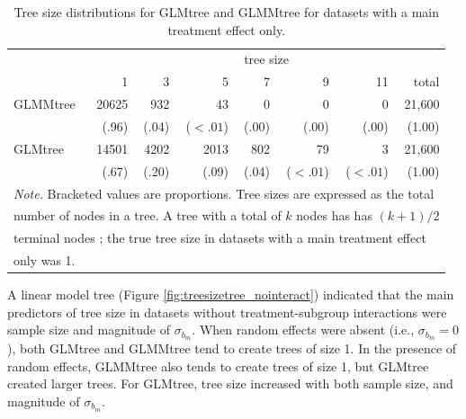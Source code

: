 \documentclass[nobf,doc]{apa}
\begin{document}
\begin{table}[!htbp]
\caption{Tree size distributions for GLMtree and GLMMtree for datasets with a main treatment effect only.}
\small
\begin{tabular}{lrrrrrrr}
	\thickline
	&\multicolumn{7}{c}{tree size}\\
	\cline{2-7}
	&   1    &   3   &   5   &   7   &   9   &  11  &   total \\
	\hline
	GLMMtree	& 20625 & 932 & 43 &0&0&0& 21,600\\
		  		& (.96) & (.04) & ($<.01$) &(.00)&(.00)&(.00)&(1.00) \\
   	GLMtree		& 14501  & 4202 & 2013 & 802 & 79 & 3 & 21,600 \\ 
    			& (.67)  & (.20) & (.09) & (.04) & ($<.01$) & ($<.01$) & (1.00)\\ 
	\hline
  	\multicolumn{8}{l}{\textit{Note. }Bracketed values are proportions. Tree sizes are expressed as the total}\\
  	\multicolumn{8}{l}{number of nodes in a tree. A tree with a total of $k$ nodes has has $(k+1)/2$ }\\
  	\multicolumn{8}{l}{terminal nodes ; the true tree size in datasets with a main treatment effect}\\	  	\multicolumn{8}{l}{only was 1.}\\
\end{tabular}
\label{tab:treesize_main}
\end{table}

A linear model tree (Figure \ref{fig:treesizetree_nointeract}) indicated that the main predictors of tree size in datasets without treatment-subgroup interactions were sample size and magnitude of $\sigma_{b_m}$. When random effects were absent (i.e., $\sigma_{b_m}=0$), both GLMtree and GLMMtree tend to create trees of size 1. In the presence of random effects, GLMMtree also tends to create trees of size 1, but GLMtree created larger trees. For GLMtree, tree size increased with both sample size, and magnitude of $\sigma_{b_m}$. 
\end{document}
